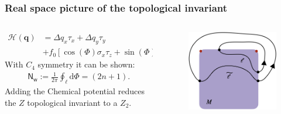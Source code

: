 \documentclass{beamer}
\renewcommand{\(}{\left(}
\renewcommand{\)}{\right)}
\renewcommand{\[}{\left[}
\renewcommand{\]}{\right]}
\begin{document}
\begin{frame}
    \frametitle{Real space picture of the topological invariant}
    \begin{columns}
        \begin{column}{0.6\textwidth}
            \begin{align*}
                \mathcal H(\bm{q})&=\Delta q_{x}\tau_x + \Delta q_{y}\tau_y\\ &+ f_0 \left[ \cos (\Phi) \sigma_x \tau_z +\sin(\Phi) \sigma_z \tau_z \right]
            \end{align*}
            With $C_4$ symmetry it can be shown: 
            \begin{align*}
                \mathsf{N}_{\mathsf{w}}:=\frac{1}{2\pi}\oint_{\ell} \mathrm{d}\Phi = (2n + 1).
            \end{align*}
            Adding the Chemical potential reduces the $Z$ topological invariant to a $Z_2$. 
        \end{column}
        \begin{column}{0.4\textwidth}
            \begin{figure}[]
                \centering
                \includegraphics[scale=0.3]{Real_space_path.png}
            \end{figure}
        \end{column}
    \end{columns}

\end{frame}
\end{document}
